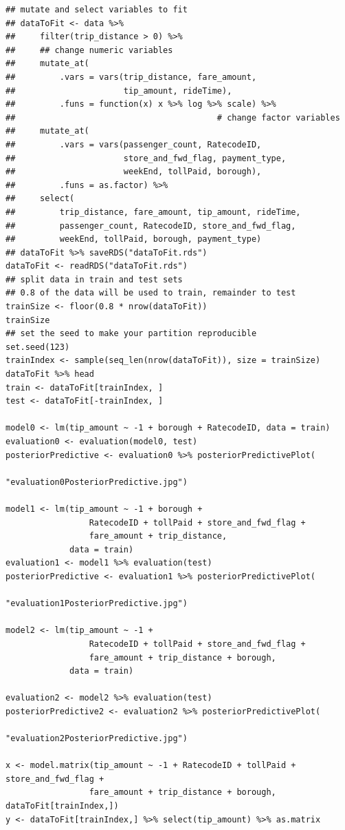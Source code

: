 \documentclass[11pt]{article}
\begin{document}
\begin{verbatim}
## mutate and select variables to fit             
## dataToFit <- data %>%
##     filter(trip_distance > 0) %>% 
##     ## change numeric variables
##     mutate_at(
##         .vars = vars(trip_distance, fare_amount,
##                      tip_amount, rideTime),
##         .funs = function(x) x %>% log %>% scale) %>%
##                                         # change factor variables
##     mutate_at(
##         .vars = vars(passenger_count, RatecodeID,
##                      store_and_fwd_flag, payment_type,
##                      weekEnd, tollPaid, borough),
##         .funs = as.factor) %>%
##     select(
##         trip_distance, fare_amount, tip_amount, rideTime,
##         passenger_count, RatecodeID, store_and_fwd_flag,
##         weekEnd, tollPaid, borough, payment_type)
## dataToFit %>% saveRDS("dataToFit.rds")
dataToFit <- readRDS("dataToFit.rds")
## split data in train and test sets
## 0.8 of the data will be used to train, remainder to test
trainSize <- floor(0.8 * nrow(dataToFit))
trainSize
## set the seed to make your partition reproducible
set.seed(123)
trainIndex <- sample(seq_len(nrow(dataToFit)), size = trainSize)
dataToFit %>% head
train <- dataToFit[trainIndex, ]
test <- dataToFit[-trainIndex, ]

model0 <- lm(tip_amount ~ -1 + borough + RatecodeID, data = train)
evaluation0 <- evaluation(model0, test)
posteriorPredictive <- evaluation0 %>% posteriorPredictivePlot(
                                           "evaluation0PosteriorPredictive.jpg")

model1 <- lm(tip_amount ~ -1 + borough +
                 RatecodeID + tollPaid + store_and_fwd_flag +
                 fare_amount + trip_distance,
             data = train)
evaluation1 <- model1 %>% evaluation(test)
posteriorPredictive <- evaluation1 %>% posteriorPredictivePlot(
                                           "evaluation1PosteriorPredictive.jpg")

model2 <- lm(tip_amount ~ -1 +
                 RatecodeID + tollPaid + store_and_fwd_flag +
                 fare_amount + trip_distance + borough,
             data = train)

evaluation2 <- model2 %>% evaluation(test)
posteriorPredictive2 <- evaluation2 %>% posteriorPredictivePlot(
                                            "evaluation2PosteriorPredictive.jpg")

x <- model.matrix(tip_amount ~ -1 + RatecodeID + tollPaid + store_and_fwd_flag +
                 fare_amount + trip_distance + borough, dataToFit[trainIndex,])
y <- dataToFit[trainIndex,] %>% select(tip_amount) %>% as.matrix


\end{verbatim}
\end{document}
